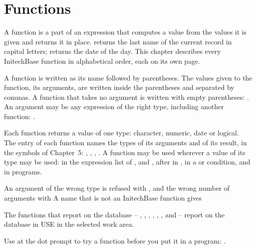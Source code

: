 \chapter{Functions}
A function is a part of an expression that computes a value from the values it
is given and returns it in place.   returns the last name
of the current record in capital letters;  returns the date of the
day.  This chapter describes every InitechBase function in alphabetical order,
each on its own page.

A function is written as its name followed by parentheses.  The values given
to the function, its arguments, are written inside the parentheses and
separated by commas.  A function that takes no argument is written with empty
parentheses: .  An argument may be any expression of the right
type, including another function: .

Each function returns a value of one type: character, numeric, date or
logical.  The entry of each function names the types of its arguments and of
its result, in the symbols of Chapter~5: , , ,
.  A function may be used wherever a value of its type may be used: in
the expression list of ,  and , after  in
, in a  or  condition, and in programs.

An argument of the wrong type is refused with ,
and the wrong number of arguments with 
A name that is not an InitechBase function gives 

The functions that report on the database -- , ,
, , , ,  and
 -- report on the database in USE in the selected work area.

\begin{Tip}
Use  at the dot prompt to try a function before you put it in a
program: .
\end{Tip}


